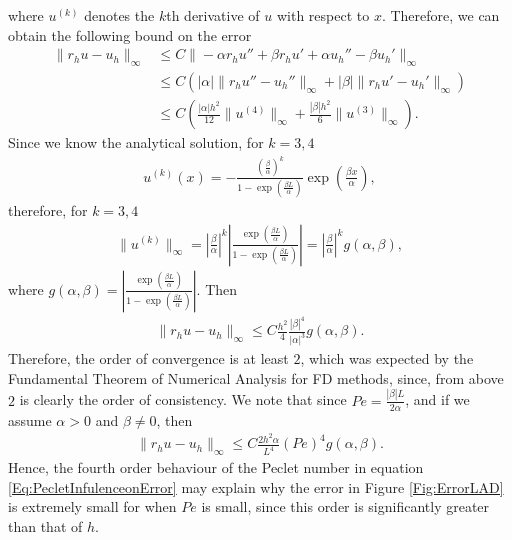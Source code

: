 \documentclass[a4paper,11pt]{article}
\theoremstyle{break}
\theoremstyle{break2}
\theoremstyle{break}
\theoremstyle{break2}
\begin{document}
where $ u^{(k)} $ denotes the $ k $th derivative of $ u $ with respect to $ x $.
Therefore, we can obtain the following bound on the error
\begin{align*}
\|r_h u - u_h\|_{\infty} &\leq C\|-\alpha r_h u'' + \beta r_h u' + \alpha u_h'' - \beta u_h'\|_{\infty} \\
&\leq C\left(|\alpha|\|r_h u'' - u_h''\|_{\infty} + |\beta|\|r_h u' - u_h' \|_{\infty}\right) \\
&\leq C\left(\frac{|\alpha|h^2}{12}\|u^{(4)}\|_{\infty} + \frac{|\beta|h^2}{6}\|u^{(3)}\|_{\infty}\right).
\end{align*}
Since we know the analytical solution, for $ k = 3,4 $
\begin{align*}
u^{(k)}(x) =-\frac{\left(\frac{\beta}{\alpha}\right)^k}{1 - \exp\left(\frac{\beta L}{\alpha}\right)}\exp\left(\frac{\beta x}{\alpha}\right),
\end{align*}
therefore, for $ k = 3,4 $
\begin{align*}
\|u^{(k)}\|_{\infty} = \left|\frac{\beta}{\alpha}\right|^{k}\left|\frac{\exp\left(\frac{\beta L}{\alpha}\right)}{1 - \exp\left(\frac{\beta L}{\alpha}\right)}\right| =\left|\frac{\beta}{\alpha}\right|^{k} g(\alpha,\beta),
\end{align*}
where $ g(\alpha,\beta) = \left|\frac{\exp\left(\frac{\beta L}{\alpha}\right)}{1 - \exp\left(\frac{\beta L}{\alpha}\right)}\right| $. Then
\begin{align*}
\|r_hu - u_h\|_{\infty} \leq C\frac{h^2}{4}\frac{|\beta|^4}{|\alpha|^3}g(\alpha,\beta).
\end{align*}
Therefore, the order of convergence is at least $ 2 $, which was expected by the Fundamental Theorem of Numerical Analysis for FD methods, since, from above $ 2 $ is clearly the order of consistency. We note that since $ Pe = \frac{|\beta|L}{2\alpha} $, and if we assume $ \alpha > 0 $ and $ \beta \neq 0 $, then
\begin{align}\label{Eq:PecletInfulenceonError}
\|r_hu - u_h\|_{\infty} \leq C\frac{2h^2\alpha}{L^4}(Pe)^4g(\alpha,\beta).
\end{align}
Hence, the fourth order behaviour of the Peclet number in equation \eqref{Eq:PecletInfulenceonError} may explain why the error in Figure \ref{Fig:ErrorLAD} is extremely small for when $ Pe $ is small, since this order is significantly greater than that of $ h $.
\end{document}
